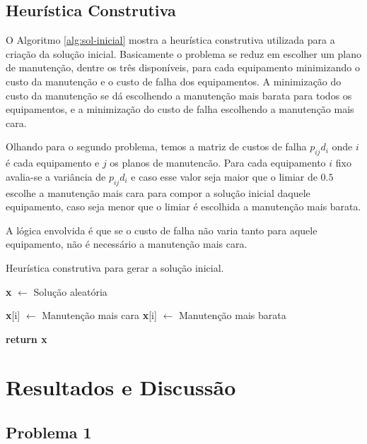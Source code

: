 \documentclass[
	12pt,				%
	oneside,			%
	a4paper,			%
	chapter=TITLE,
	sumario=tradicional,
	english,			%
	brazil				%
]{abntex2}
\begin{document}
\section{Heurística Construtiva}

O Algoritmo \ref{alg:sol-inicial} mostra a heurística construtiva utilizada para a criação da solução inicial. Basicamente o problema se reduz
em escolher um plano de manutenção, dentre os três disponíveis, para cada equipamento minimizando o custo da manutenção e o custo de falha dos equipamentos.
A minimização do custo da manutenção se dá escolhendo a manutenção mais barata para todos os equipamentos, e a minimização do custo de falha escolhendo a manutenção mais cara.

Olhando para o segundo problema, temos a matriz de custos de falha $p_{ij}d_{i}$ onde $i$ é cada equipamento e $j$ os planos de manutencão. Para cada equipamento $i$ fixo avalia-se a
variância de $p_{ij}d_{i}$ e caso esse valor seja maior que o limiar de $0.5$ escolhe a manutenção mais cara para compor a solução inicial daquele equipamento,
caso seja menor que o limiar é escolhida a manutenção mais barata. 

A lógica envolvida é que se o custo de falha não varia tanto para aquele equipamento,
não é necessário a manutenção mais cara.

\begin{algorithm}[H]
	\caption{Heurística construtiva para gerar a solução inicial.}\label{alg:sol-inicial}
	\begin{algorithmic}[1]

	\State \textbf{x} $\gets$ Solução aleatória

			\State \textbf{x}[i] $\gets$ Manutenção mais cara
		\Else
			\State \textbf{x}[i] $\gets$ Manutenção mais barata
		\EndIf
	\EndFor
	   
	\Statex
	\State \textbf{return x} 
	\EndProcedure 
	\end{algorithmic}
\end{algorithm}


\chapter{Resultados e Discussão}\label{cap:resultados} 


\section{Problema 1}
\end{document}
